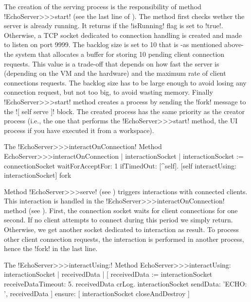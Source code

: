 \documentclass[a4paper,10pt,twoside]{book}
\begin{document}
The creation of the serving process is the responsibility of method \ct!EchoServer>>>start! (see the last line of ).
The  method first checks wether the server is already running.
It returns if the \ct!isRunning! flag is set to \ct!true!.
Otherwise, a TCP socket dedicated to connection handling is created and made to listen on port 9999.
The backlog size is set to 10 that is -as mentioned above- the system that allocates a buffer for storing 10 pending client connection requests.
This value is a trade-off that depends on how fast the server is (depending on the VM and the hardware) and the maximum rate of client connections requests.
The backlog size has to be large enough to avoid losing any connection request, but not too big, to avoid wasting memory.
Finally \ct!EchoServer>>>start! method creates a process by sending the \ct!fork! message to the \ct![ self serve ]! block.
The created process has the same priority as the creator process (i.e., the one that performs the \ct!EchoServer>>>start! method, the UI process if you have executed it from a workspace).


\begin{method}{The \ct!EchoServer>>>interactOnConnection! Method}
EchoServer>>>interactOnConnection
	| interactionSocket |
	interactionSocket := connectionSocket waitForAcceptFor: 1 ifTimedOut: [^self].
	[self interactUsing: interactionSocket] fork
\end{method}

Method \ct!EchoServer>>>serve! (see ) triggers interactions with connected clients.
This interaction is handled in the \ct!EchoServer>>>interactOnConnection! method (see ).
First, the connection socket waits for client connections for one second.
If no client attempts to connect during this period we simply return.
Otherwise, we get another socket dedicated to interaction as result.
To process other client connection requests, the interaction is performed in another process, hence the \ct!fork! in the last line.

\begin{method}{The \ct!EchoServer>>>interactUsing:! Method}
EchoServer>>>interactUsing: interactionSocket
	| receivedData |
	[ receivedData := interactionSocket receiveDataTimeout: 5.
	 receivedData crLog.
	 interactionSocket sendData: 'ECHO: ', receivedData
	] ensure: [
	 interactionSocket closeAndDestroy ]
\end{method}
\end{document}
